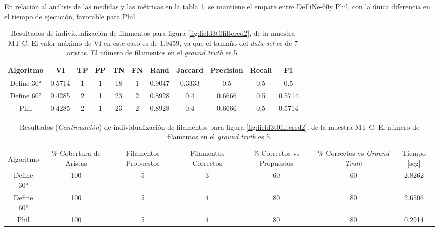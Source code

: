 En relaci\'on al an\'alisis de las medidas y las m\'etricas en la tabla \ref{tab:field3t0filtered2}, se mantiene el empate entre DeFiNe-60\textdegree y Phil, con la \'unica diferencia en el tiempo de ejecuci\'on, favorable para Phil. 

\begin{table}[h]
    \centering
    \begin{tabular}{|c|c|c|c|c|c|c|c|c|c|c|}
    \hline
        Algoritmo & VI & TP & FP &TN &FN & Rand	& Jaccard &	Precision &	Recall &	F1 \\ \hline
        Define 30° & 0.5714 & 1 & 1 & 18 & 1 & 0.9047 & 0.3333 & 0.5      & 0.5 & 0.5\\
        Define 60° & 0.4285 & 2 & 1 & 23 & 2 & 0.8928 & 0.4 & 0.6666 & 0.5 & 0.5714\\ 
        Phil & 0.4285  & 2 & 1 & 23 & 2 & 0.8928 & 0.4 & 0.6666 & 0.5 & 0.5714\\
        \hline
    \end{tabular}
    \caption{Resultados de individualizaci\'on de filamentos para figura \ref{fig:field3t0filtered2}, de la muestra MT-C. El valor m\'aximo de VI en este caso es de 1.9459, ya que el tama\~no del {\it data set} es de 7 aristas. El n\'umero de filamentos en el {\it ground truth} es 5.}
    \label{tab:field3t0filtered2}
\end{table}
\addtocounter{table}{-1}
\begin{table}[h]
    \centering
    \begin{tabular}{|c|c|c|c|c|c|c|}
    \hline
         & \multirow{4}{2cm}{\centering \% Cobertura de Aristas} & \multirow{4}{2cm}{Filamentos Propuestos} & \multirow{4}{2cm}{Filamentos Correctos} & \multirow{4}{2.5cm}{\% Correctos vs Propuestos} & \multirow{4}{2.5cm}{\centering \% Correctos vs {\it Ground Truth}} & \multirow{4}{1.2cm}{\centering Tiempo [seg]} \\
         &  &  &  & & &  \\
        Algoritmo &  &  &  & & &  \\
        &  &  &  & & &  \\ \hline
        Define 30° & 100 & 5 & 3 & 60 & 60 & 2.8262\\
        Define 60° & 100 & 5 & 4 & 80 & 80 & 2.6506\\ 
        Phil & 100 & 5 & 4 & 80 & 80 & 0.2914\\
        \hline
    \end{tabular}
    \caption{Resultados ({\it Continuaci\'on}) de individualizaci\'on de filamentos para figura \ref{fig:field3t0filtered2}, de la muestra MT-C. El n\'umero de filamentos en el {\it ground truth} es 5.}
\end{table}

